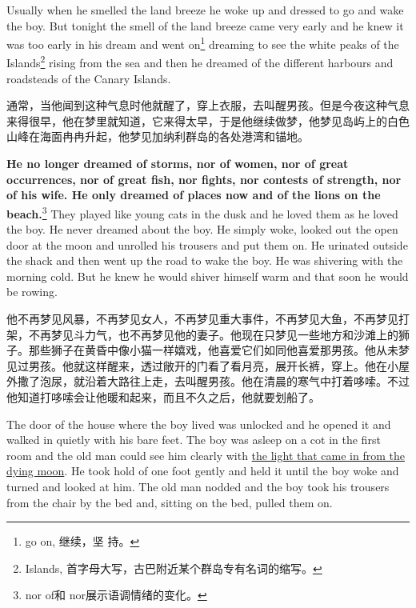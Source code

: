 \begin{paracol}{2}
\switchcolumn*

Usually when he smelled the land breeze he woke up and dressed to go and
wake the boy. But tonight the smell of the land breeze came very early and
he knew it was too early in his dream and went on\footnote{go on, 继续，坚
  持。} dreaming to see the white \glspl{peak} of the
Islands\footnote{Islands, 首字母大写，古巴附近某个群岛专有名词的缩写。} rising from
the sea and then he dreamed of the different harbours and roadsteads of the
Canary Islands.

\switchcolumn

通常，当他闻到这种气息时他就醒了，穿上衣服，去叫醒男孩。但是今夜这种气息来得很早，他在梦里就知道，它来得太早，于是他继续做梦，他梦见岛屿上的白色山峰在海面冉冉升起，他梦见加纳利群岛的各处港湾和锚地。

\switchcolumn*

\textbf{He no longer dreamed of storms, nor of women, nor of great
  \glspl{occurrence}, nor of great fish, nor fights, nor contests of
  \gls{strength}, nor of his wife. He only dreamed of places now and of the
  lions on the beach.}\footnote{nor of和 nor展示语调情绪的变化。} They
played like young cats in the \gls{dusk} and he loved them as he loved the boy. He
never dreamed about the boy. He simply woke, looked out the open door at the
moon and unrolled his trousers and put them on. He \gls{urinated} outside
the shack and then went up the road to wake the boy. He was shivering with
the morning cold. But he knew he would shiver himself warm and that soon he
would be rowing.

\switchcolumn

他不再梦见风暴，不再梦见女人，不再梦见重大事件，不再梦见大鱼，不再梦见打架，不再梦见斗力气，也不再梦见他的妻子。他现在只梦见一些地方和沙滩上的狮子。那些狮子在黄昏中像小猫一样嬉戏，他喜爱它们如同他喜爱那男孩。他从未梦见过男孩。他就这样醒来，透过敞开的门看了看月亮，展开长裤，穿上。他在小屋外撒了泡尿，就沿着大路往上走，去叫醒男孩。他在清晨的寒气中打着哆嗦。不过他知道打哆嗦会让他暖和起来，而且不久之后，他就要划船了。

\switchcolumn*

The door of the house where the boy lived was unlocked and he opened it and
walked in quietly with his \gls{bare} \gls{feet}. The boy was asleep on a
\gls{cot} in the first room and the old man could see him clearly with
\uline{the light that came in from the dying moon}. He took hold of one foot
\gls{gently} and held it until the boy woke and turned and looked at him.
The old man \gls{nodded} and the boy took his trousers from the chair by the
bed and, sitting on the bed, pulled them on.


\end{paracol}
